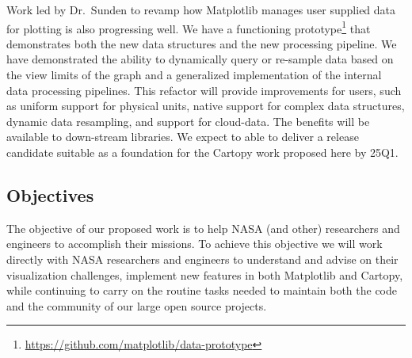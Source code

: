 \documentclass[12pt]{article}
\numberwithin{page}{section}
\begin{document}
Work led by Dr.\ Sunden to revamp how Matplotlib manages user supplied data for
plotting is also progressing well.  We have a functioning
prototype\footnote{\url{https://github.com/matplotlib/data-prototype}} that
demonstrates both the new data structures and the new processing pipeline.  We
have demonstrated the ability to dynamically query or re-sample data based on
the view limits of the graph and a generalized implementation of the internal
data processing pipelines.  This refactor will provide improvements for users,
such as uniform support for physical units, native support for complex data
structures, dynamic data resampling, and support for cloud-data.  The benefits
will be available to down-stream libraries.  We expect to able to deliver a
release candidate suitable as a foundation for the Cartopy work proposed here
by 25Q1.


\subsection{Objectives}



%


The objective of our proposed work is to help NASA (and other) researchers and
engineers to accomplish their missions.
To achieve this objective we will work directly with NASA
researchers and engineers to understand and advise on their visualization
challenges, implement new features in both Matplotlib and Cartopy, while continuing
to carry on the routine tasks needed to maintain both the code and the community
of our large open source projects.
\end{document}
